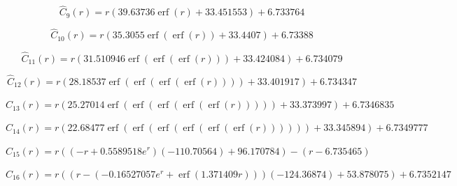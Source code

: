 \documentclass[12pt,twoside,final]{article}
\begin{document}
\begin{equation}
\widehat C_{9}(r) = r \left(39.63736 \operatorname{erf}{\left(r \right)} + 33.451553\right) + 6.733764
\end{equation}

\begin{equation}
\widehat C_{10}(r) = r \left(35.3055 \operatorname{erf}{\left(\operatorname{erf}{\left(r \right)} \right)} + 33.4407\right) + 6.73388
\end{equation}

\begin{equation}
\widehat C_{11}(r) = r \left(31.510946 \operatorname{erf}{\left(\operatorname{erf}{\left(\operatorname{erf}{\left(r \right)} \right)} \right)} + 33.424084\right) + 6.734079
\end{equation}

\begin{equation}
\widehat C_{12}(r) = r \left(28.18537 \operatorname{erf}{\left(\operatorname{erf}{\left(\operatorname{erf}{\left(\operatorname{erf}{\left(r \right)} \right)} \right)} \right)} + 33.401917\right) + 6.734347
\end{equation}

\begin{equation}
\widehat C_{13}(r) = r \left(25.27014 \operatorname{erf}{\left(\operatorname{erf}{\left(\operatorname{erf}{\left(\operatorname{erf}{\left(\operatorname{erf}{\left(r \right)} \right)} \right)} \right)} \right)} + 33.373997\right) + 6.7346835
\end{equation}

\begin{equation}
\widehat C_{14}(r) = r \left(22.68477 \operatorname{erf}{\left(\operatorname{erf}{\left(\operatorname{erf}{\left(\operatorname{erf}{\left(\operatorname{erf}{\left(\operatorname{erf}{\left(r \right)} \right)} \right)} \right)} \right)} \right)} + 33.345894\right) + 6.7349777
\end{equation}

\begin{equation}
\widehat C_{15}(r) = r \left(\left(- r + 0.5589518 e^{r}\right) \left(-110.70564\right) + 96.170784\right) - \left(r - 6.735465\right)
\end{equation}

\begin{equation}
\widehat C_{16}(r) = r \left(\left(r - \left(-0.16527057 e^{r} + \operatorname{erf}{\left(1.371409 r \right)}\right)\right) \left(-124.36874\right) + 53.878075\right) + 6.7352147
\end{equation}
\end{document}
